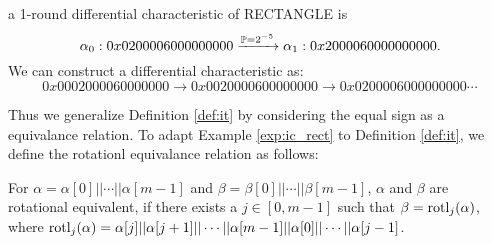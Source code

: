 \begin{example}\label{exp:ic_rect}
    a 1-round differential characteristic of RECTANGLE \cite{zhang2015rectangle} is
    \[
        \alpha_0:0x 0200 0060 0000 0000\xrightarrow{\mathbb{P}=2^{-5}}\alpha_1:0x 2000 0600 0000 0000.
    \]
    We can construct a differential characteristic as:
    \[
        0x 0002 0000 6000 0000 \rightarrow 0x 0020 0006 0000 0000 \rightarrow 0x 0200 0060 0000 0000 \cdots
    \]
\end{example}

Thus we generalize Definition \ref{def:it} by considering the equal sign as a equivalance relation. To adapt Example \ref{exp:ic_rect} to Definition \ref{def:it}, we define the rotationl equivalance relation as follows:



\begin{definition}
	For $\alpha=\alpha[0]||\cdots||\alpha[m-1]$ and $\beta=\beta[0]||\cdots||\beta[m-1]$, $\alpha$ and $\beta$ are rotational equivalent, if there exists a $j\in[0,m-1]$ such that $\beta=\text{rotl}_j(\alpha)$, where $\text{rotl}_j(\alpha)=\alpha[j]||\alpha[j+1]||\cdots||\alpha[m-1]||\alpha[0]||\cdots||\alpha[j-1]$. 
\end{definition}



